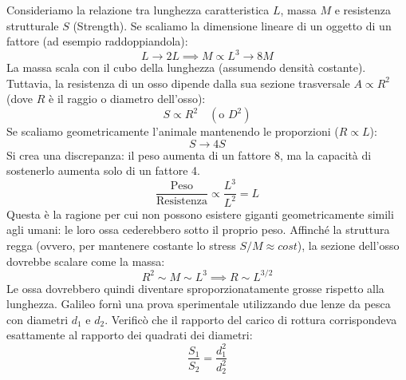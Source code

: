 Consideriamo la relazione tra lunghezza caratteristica $L$, massa $M$ e resistenza strutturale $S$ (Strength).
Se scaliamo la dimensione lineare di un oggetto di un fattore (ad esempio raddoppiandola):
\begin{equation}
    L \to 2L \implies M \propto L^3 \to 8M
\end{equation}
La massa scala con il cubo della lunghezza (assumendo densità costante). Tuttavia, la resistenza di un osso dipende dalla sua sezione trasversale $A \propto R^2$ (dove $R$ è il raggio o diametro dell'osso):
\begin{equation}
    S \propto R^2 \quad (\text{o } D^2)
\end{equation}
Se scaliamo geometricamente l'animale mantenendo le proporzioni ($R \propto L$):
\begin{equation}
    S \to 4S
\end{equation}
Si crea una discrepanza: il peso aumenta di un fattore 8, ma la capacità di sostenerlo aumenta solo di un fattore 4.
\begin{equation}
    \frac{\text{Peso}}{\text{Resistenza}} \propto \frac{L^3}{L^2} = L
\end{equation}
Questa è la ragione per cui non possono esistere giganti geometricamente simili agli umani: le loro ossa cederebbero sotto il proprio peso. Affinché la struttura regga (ovvero, per mantenere costante lo stress $S/M \approx cost$), la sezione dell'osso dovrebbe scalare come la massa:
\begin{equation}
    R^2 \sim M \sim L^3 \implies R \sim L^{3/2}
\end{equation}
Le ossa dovrebbero quindi diventare sproporzionatamente grosse rispetto alla lunghezza.
Galileo fornì una prova sperimentale utilizzando due lenze da pesca con diametri $d_1$ e $d_2$. Verificò che il rapporto del carico di rottura corrispondeva esattamente al rapporto dei quadrati dei diametri:
\begin{equation}
    \frac{S_1}{S_2} = \frac{d_1^2}{d_2^2}
\end{equation}

